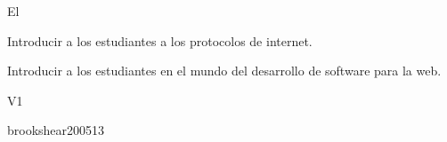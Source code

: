 \begin{syllabus}


\begin{justification}
El 
\end{justification}

\begin{goals}
\item Introducir a los estudiantes a los protocolos de internet.
\item Introducir a los estudiantes en el mundo del desarrollo de software para la web.
\end{goals}

\begin{outcomes}{V1}
   \item {}
   \item {}
   \item {}
   \item {}
   \item {}
\end{outcomes}

\begin{unit}{\NCIntroduction}{}{brookshear2005}{1}{3}
   \NCIntroductionAllTopics
   \NCIntroductionAllLearningOutcomes
\end{unit}

\begin{coursebibliography}
\end{coursebibliography}

\end{syllabus}

%

